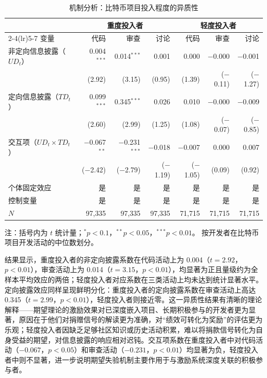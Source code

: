 \documentclass[
    type = master, %
    degree = professional,        %
    decl-page,  %
    twoside,                %
    fontset = fandol %
  ]{njuthesis}
\begin{document}
\begin{table}[htbp]
    \centering
    \caption{机制分析：比特币项目投入程度的异质性}
    \label{tab:mechanism-heavy-light}
    \small
    \begin{tabularx}{\textwidth}{Xrrrrrr}
        \toprule
        & \multicolumn{3}{c}{重度投入者}
        & \multicolumn{3}{c}{轻度投入者} \\
        \cmidrule(lr){2-4}\cmidrule(lr){5-7}
        变量 & 代码 & 审查 & 讨论 & 代码 & 审查 & 讨论 \\
        \midrule
        非定向信息披露（$UD_t$）
            & 0.004$^{***}$ & 0.014$^{***}$ & 0.001
            & 0.000 & $-$0.000 & $-$0.001 \\
            & (2.92) & (3.15) & (0.95)
            & (1.39) & ($-$0.11) & ($-$1.27) \\[0.4em]
        定向信息披露（$TD_t$）
            & 0.099$^{***}$ & 0.345$^{***}$ & 0.026
            & 0.010 & $-$0.000 & $-$0.009 \\
            & (2.60) & (2.99) & (1.25)
            & (1.08) & ($-$0.07) & ($-$0.85) \\[0.4em]
        交互项（$UD_t \times TD_t$）
            & $-$0.067$^{**}$ & $-$0.231$^{***}$ & $-$0.018
            & $-$0.007 & 0.000 & 0.007 \\
            & ($-$2.42) & ($-$2.79) & ($-$1.19)
            & ($-$1.05) & (0.09) & (0.92) \\[0.4em]
        \midrule
        个体固定效应 & 是 & 是 & 是 & 是 & 是 & 是 \\
        控制变量 & 是 & 是 & 是 & 是 & 是 & 是 \\
        $N$ & 97,335 & 97,335 & 97,335 & 71,715 & 71,715 & 71,715 \\
        \bottomrule
    \end{tabularx}
    \begin{minipage}{\textwidth}
        \vspace{0.3em}
        \footnotesize 注：括号内为 $t$ 统计量；$^{*}p<0.1$，$^{**}p<0.05$，$^{***}p<0.01$。
        按开发者在比特币项目开发活动的中位数划分。
    \end{minipage}
\end{table}

结果显示，重度投入者的非定向披露系数在代码活动上为 0.004（$t = 2.92$，$p < 0.01$），审查活动上为 0.014（$t = 3.15$，$p < 0.01$），均显著为正且量级约为全样本平均效应的两倍；轻度投入者对应系数在三类活动上均未达到统计显著水平。定向披露效应同样呈现鲜明分化：重度投入者的定向披露系数在审查活动上高达 0.345（$t = 2.99$，$p < 0.01$），轻度投入者则接近零。这一异质性结果有清晰的理论解释——期望理论的激励效果对已深度嵌入项目、长期积极参与的开发者更为显著，原因在于他们对捐赠信号的解读更为准确，对“绩效可转化为奖励”的评估更为乐观；轻度投入者因缺乏足够社区知识或历史活动积累，难以将捐款信号转化为自身受益的期望，对信息披露的响应相对迟钝。交互项系数在重度投入者中对代码活动（$-0.067$，$p < 0.05$）和审查活动（$-0.231$，$p < 0.01$）均显著为负，轻度投入者中则不显著，进一步说明期望失验机制主要作用于与激励系统深度关联的积极参与者。
\end{document}
